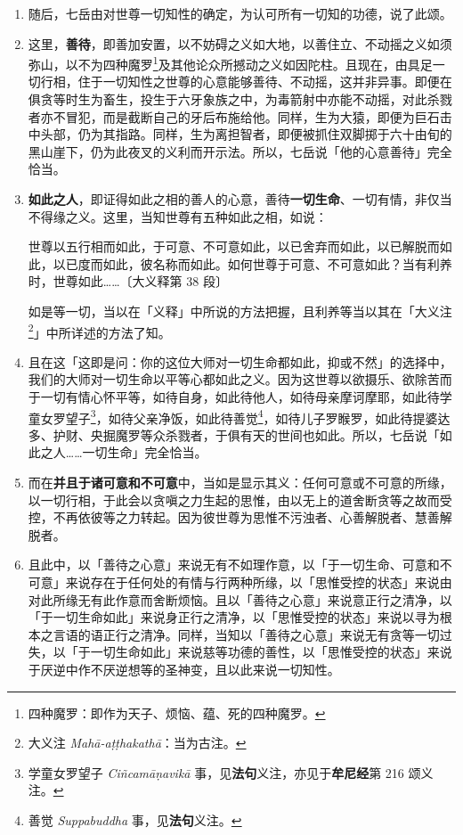 \begin{enumerate}\item 随后，七岳由对世尊一切知性的确定，为认可所有一切知的功德，说了此颂。
\item 这里，\textbf{善待}，即善加安置，以不妨碍之义如大地，以善住立、不动摇之义如须弥山，以不为四种魔罗\footnote{四种魔罗：即作为天子、烦恼、蕴、死的四种魔罗。}及其他论众所撼动之义如因陀柱。且现在，由具足一切行相，住于一切知性之世尊的心意能够善待、不动摇，这并非异事。即便在俱贪等时生为畜生，投生于六牙象族之中，为毒箭射中亦能不动摇，对此杀戮者亦不冒犯，而是截断自己的牙后布施给他。同样，生为大猿，即便为巨石击中头部，仍为其指路。同样，生为离担智者，即便被抓住双脚掷于六十由旬的黑山崖下，仍为此夜叉的义利而开示法。所以，七岳说「他的心意善待」完全恰当。
\item \textbf{如此之人}，即证得如此之相的善人的心意，善待\textbf{一切生命}、一切有情，非仅当不得缘之义。这里，当知世尊有五种如此之相，如说：\begin{quoting}世尊以五行相而如此，于可意、不可意如此，以已舍弃而如此，以已解脱而如此，以已度而如此，彼名称而如此。如何世尊于可意、不可意如此？当有利养时，世尊如此……{\bluefootnotesize 〔大义释第 38 段〕}\end{quoting}如是等一切，当以在「义释」中所说的方法把握，且利养等当以其在「大义注\footnote{大义注 \textit{Mahā-aṭṭhakathā}：当为古注。}」中所详述的方法了知。
\item 且在这「这即是问：你的这位大师对一切生命都如此，抑或不然」的选择中，我们的大师对一切生命以平等心都如此之义。因为这世尊以欲摄乐、欲除苦而于一切有情心怀平等，如待自身，如此待他人，如待母亲摩诃摩耶，如此待学童女罗望子\footnote{学童女罗望子 \textit{Ciñcamāṇavikā} 事，见\textbf{法句}义注，亦见于\textbf{牟尼经}第 216 颂义注。}，如待父亲净饭，如此待善觉\footnote{善觉 \textit{Suppabuddha} 事，见\textbf{法句}义注。}，如待儿子罗睺罗，如此待提婆达多、护财、央掘魔罗等众杀戮者，于俱有天的世间也如此。所以，七岳说「如此之人……一切生命」完全恰当。
\item 而在\textbf{并且于诸可意和不可意}中，当如是显示其义：任何可意或不可意的所缘，以一切行相，于此会以贪嗔之力生起的思惟，由以无上的道舍断贪等之故而受控，不再依彼等之力转起。因为彼世尊为思惟不污浊者、心善解脱者、慧善解脱者。
\item 且此中，以「善待之心意」来说无有不如理作意，以「于一切生命、可意和不可意」来说存在于任何处的有情与行两种所缘，以「思惟受控的状态」来说由对此所缘无有此作意而舍断烦恼。且以「善待之心意」来说意正行之清净，以「于一切生命如此」来说身正行之清净，以「思惟受控的状态」来说以寻为根本之言语的语正行之清净。同样，当知以「善待之心意」来说无有贪等一切过失，以「于一切生命如此」来说慈等功德的善性，以「思惟受控的状态」来说于厌逆中作不厌逆想等的圣神变，且以此来说一切知性。\end{enumerate}

